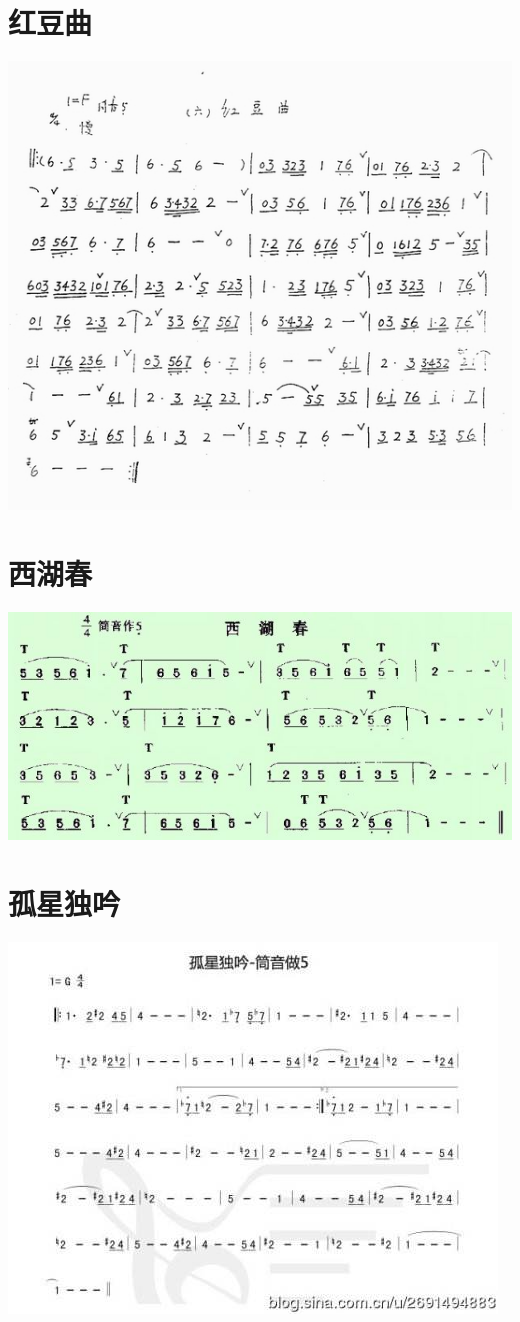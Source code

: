 \documentclass[cn,pad,chinese,chinesefont=nofont]{elegantbook}
\begin{document}
\section{红豆曲}
    \includegraphics[width=\textwidth]{dongxiao/红豆曲.jpg}
\section{西湖春}
    \includegraphics[width=\textwidth]{dongxiao/西湖春.jpg}
    
\section{孤星独吟}
    \includegraphics[width=\textwidth]{dongxiao/孤星独吟.jpg}
\end{document}
